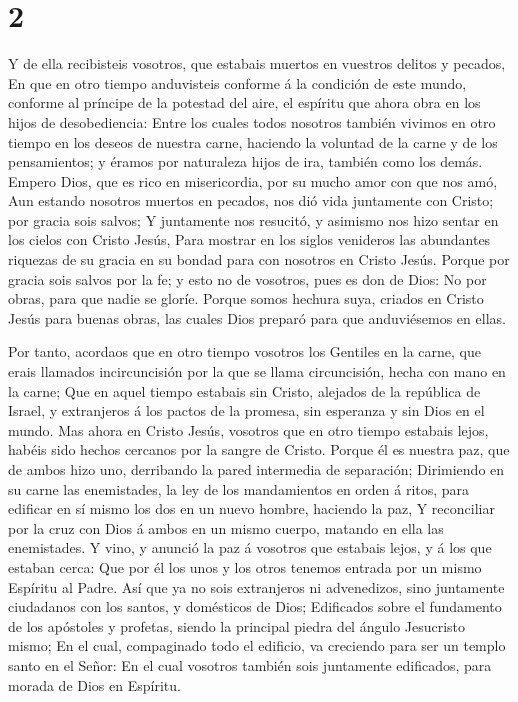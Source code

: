 \hypertarget{section-1}{%
\section{2}\label{section-1}}

 Y de ella recibisteis vosotros, que estabais muertos en
vuestros delitos y pecados,  En que en otro tiempo
anduvisteis conforme á la condición de este mundo, conforme al príncipe
de la potestad del aire, el espíritu que ahora obra en los hijos de
desobediencia:  Entre los cuales todos nosotros también
vivimos en otro tiempo en los deseos de nuestra carne, haciendo la
voluntad de la carne y de los pensamientos; y éramos por naturaleza
hijos de ira, también como los demás.  Empero Dios, que es
rico en misericordia, por su mucho amor con que nos amó, 
Aun estando nosotros muertos en pecados, nos dió vida juntamente con
Cristo; por gracia sois salvos;  Y juntamente nos resucitó,
y asimismo nos hizo sentar en los cielos con Cristo Jesús, 
Para mostrar en los siglos venideros las abundantes riquezas de su
gracia en su bondad para con nosotros en Cristo Jesús. 
Porque por gracia sois salvos por la fe; y esto no de vosotros, pues es
don de Dios:  No por obras, para que nadie se gloríe.
 Porque somos hechura suya, criados en Cristo Jesús para
buenas obras, las cuales Dios preparó para que anduviésemos en ellas.

 Por tanto, acordaos que en otro tiempo vosotros los
Gentiles en la carne, que erais llamados incircuncisión por la que se
llama circuncisión, hecha con mano en la carne;  Que en
aquel tiempo estabais sin Cristo, alejados de la república de Israel, y
extranjeros á los pactos de la promesa, sin esperanza y sin Dios en el
mundo.  Mas ahora en Cristo Jesús, vosotros que en otro
tiempo estabais lejos, habéis sido hechos cercanos por la sangre de
Cristo.  Porque él es nuestra paz, que de ambos hizo uno,
derribando la pared intermedia de separación;  Dirimiendo
en su carne las enemistades, la ley de los mandamientos en orden á
ritos, para edificar en sí mismo los dos en un nuevo hombre, haciendo la
paz,  Y reconciliar por la cruz con Dios á ambos en un
mismo cuerpo, matando en ella las enemistades.  Y vino, y
anunció la paz á vosotros que estabais lejos, y á los que estaban cerca:
 Que por él los unos y los otros tenemos entrada por un
mismo Espíritu al Padre.  Así que ya no sois extranjeros ni
advenedizos, sino juntamente ciudadanos con los santos, y domésticos de
Dios;  Edificados sobre el fundamento de los apóstoles y
profetas, siendo la principal piedra del ángulo Jesucristo mismo;
 En el cual, compaginado todo el edificio, va creciendo
para ser un templo santo en el Señor:  En el cual vosotros
también sois juntamente edificados, para morada de Dios en Espíritu.

